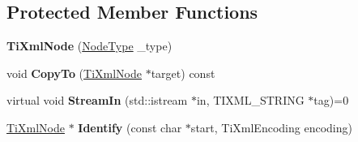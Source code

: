 \subsection*{Protected Member Functions}
\begin{DoxyCompactItemize}
\item 
\mbox{\label{class_ti_xml_node_a3f46721695868667113c7487ff123f20}} 
{\bfseries Ti\+Xml\+Node} (\hyperlink{class_ti_xml_node_a836eded4920ab9e9ef28496f48cd95a2}{Node\+Type} \+\_\+type)
\item 
\mbox{\label{class_ti_xml_node_aaadd5bb9c94f84c4472b649b95de4a0b}} 
void {\bfseries Copy\+To} (\hyperlink{class_ti_xml_node}{Ti\+Xml\+Node} $\ast$target) const
\item 
\mbox{\label{class_ti_xml_node_ab4b4af1a6b486dcbc0e327cf291270af}} 
virtual void {\bfseries Stream\+In} (std\+::istream $\ast$in, T\+I\+X\+M\+L\+\_\+\+S\+T\+R\+I\+NG $\ast$tag)=0
\item 
\mbox{\label{class_ti_xml_node_ac1e3a8e7578be463b04617786120c2bb}} 
\hyperlink{class_ti_xml_node}{Ti\+Xml\+Node} $\ast$ {\bfseries Identify} (const char $\ast$start, Ti\+Xml\+Encoding encoding)
\end{DoxyCompactItemize}
